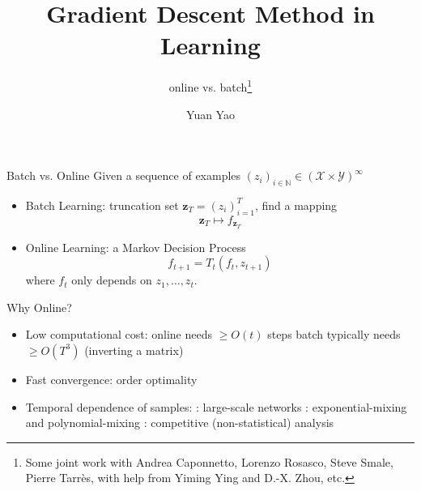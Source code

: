 \documentclass[pdf,autumn,slideColor,colorBG]{prosper}
\title{Gradient Descent Method in Learning}
\subtitle{online vs. batch\footnote{Some joint work with Andrea Caponnetto, Lorenzo Rosasco, Steve Smale, Pierre Tarr\`es, with help from
Yiming Ying and D.-X. Zhou, etc.}}
\author{Yuan Yao}
\theoremstyle{theorem}
\theoremstyle{definition}
\theoremstyle{remark}
\def\X{{\mathcal X}}
\def\Y{{\mathcal Y}}
\def\N{{\mathbb N}}
\def\z{{\mathbf z}}
\begin{document}
\maketitle


%
\begin{slide}{Batch vs. Online}
Given a sequence of examples $(z_i)_{i\in \N}\in (\X\times \Y)^\infty$

\begin{itemize}
    \item Batch Learning: truncation set $\z_T=(z_i)_{i=1}^T$, find a mapping
\[ \z_T \mapsto f_{\z_T} \]

    \item Online Learning: a Markov Decision Process
\[ f_{t+1} = T_t(f_{t},z_{t+1}) \]
where $f_t$ only depends on $z_1,\ldots,z_t$.

\end{itemize}
\end{slide}


%
\begin{slide}{Why Online?}
\begin{itemize}
    \item Low computational cost:
        \subitem online needs $\geq O(t)$ steps
        \subitem batch typically needs $\geq O(T^3)$ (inverting a matrix)
    \item Fast convergence: order optimality
    \item Temporal dependence of samples:
        : large-scale networks
        : exponential-mixing and polynomial-mixing
        : competitive (non-statistical) analysis
\end{itemize}
\end{slide}
\end{document}
